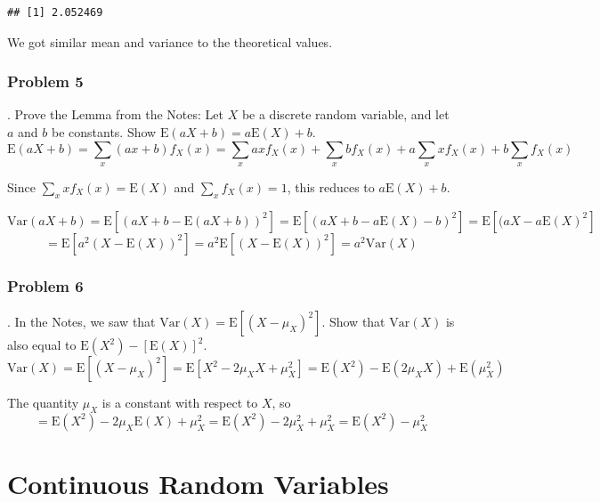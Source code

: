 \documentclass[
]{book}
\begin{document}
\begin{verbatim}
## [1] 2.052469
\end{verbatim}

We got similar mean and variance to the theoretical values.

\hypertarget{problem-5-2}{%
\subsection{Problem 5}\label{problem-5-2}}

. Prove the Lemma from the Notes: Let \(X\) be a discrete random variable, and let \(a\) and \(b\) be constants. Show \(\mbox{E}(aX + b)=a\mbox{E}(X)+b\).\\
\[
\mbox{E}(aX+b)=\sum_x (ax+b)f_X(x) = \sum_x axf_X(x)+\sum_x bf_X(x) + a\sum_x xf_X(x)+b\sum_x f_X(x)
\]

Since \(\sum_x xf_X(x) = \mbox{E}(X)\) and \(\sum_x f_X(x)=1\), this reduces to \(a\mbox{E}(X)+b\).

\[
\mbox{Var}(aX+b)=\mbox{E}\left[(aX+b-\mbox{E}(aX+b))^2\right]=\mbox{E}\left[(aX+b-a\mbox{E}(X)-b)^2\right]=\mbox{E}\left[(aX-a\mbox{E}(X)^2\right]
\]
\[
=\mbox{E}\left[a^2(X-\mbox{E}(X))^2\right]=a^2\mbox{E}\left[(X-\mbox{E}(X))^2\right]=a^2\mbox{Var}(X)
\]

\hypertarget{problem-6-1}{%
\subsection{Problem 6}\label{problem-6-1}}

. In the Notes, we saw that \(\mbox{Var}(X)=\mbox{E}[(X-\mu_X)^2]\). Show that \(\mbox{Var}(X)\) is also equal to \(\mbox{E}(X^2)-[\mbox{E}(X)]^2\).
\[
\mbox{Var}(X)=\mbox{E}[(X-\mu_X)^2]=\mbox{E}[X^2-2\mu_XX+\mu_X^2] = \mbox{E}(X^2)-\mbox{E}(2\mu_XX)+\mbox{E}(\mu_X^2)
\]

The quantity \(\mu_X\) is a constant with respect to \(X\), so
\[
=\mbox{E}(X^2)-2\mu_X\mbox{E}(X)+\mu_X^2=\mbox{E}(X^2)-2\mu_X^2+\mu_X^2 = \mbox{E}(X^2)-\mu_X^2
\]

\hypertarget{CONRANDVAR}{%
\chapter{Continuous Random Variables}\label{CONRANDVAR}}

\newcommand{\E}{\mbox{E}}
\newcommand{\Var}{\mbox{Var}}
\newcommand{\Cov}{\mbox{Cov}}
\newcommand{\Prob}{\mbox{P}}
\newcommand*\diff{\mathop{}\!\mathrm{d}}
\end{document}
